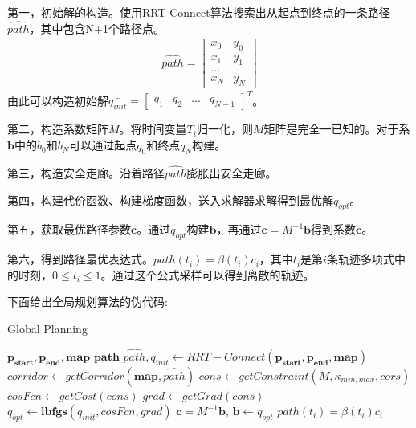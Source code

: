 \documentclass[master,academic]{ysuthesis} %
\begin{document}
		第一，初始解的构造。使用RRT-Connect算法搜索出从起点到终点的一条路径$\hat{path}$，其中包含N+1个路径点。
		\begin{equation}
			\begin{aligned}
				\hat{path} = \begin{bmatrix}
					x_0 &y_0\\
					x_1&y_1\\
					...\\
					x_N& y_N
				\end{bmatrix} 
			\end{aligned}
		\end{equation}
		由此可以构造初始解$\bar{q_{init}}
		=\begin{bmatrix}
			q_1& q_2& ...&q_{N-1}
		\end{bmatrix}^T$。

		第二，构造系数矩阵$M$。将时间变量$T_i$归一化，则$M$矩阵是完全一已知的。对于系$\mathbf{b}$中的$b_0$和$b_N$可以通过起点$q_0$和终点$q_N$构建。
		
		第三，构造安全走廊。沿着路径$\hat{path}$膨胀出安全走廊。

		第四，构建代价函数、构建梯度函数，送入求解器求解得到最优解$q_{opt}$。

		第五，获取最优路径参数$\mathbf{c}$。通过$q_{opt}$构建$\mathbf{b}$，再通过$\mathbf{c} = M^{-1}\mathbf{b}$得到系数$\mathbf{c}$。

		第六，得到路径最优表达式。$path(t_i)=\beta(t_i)c_i$，其中$t_i$是第$i$条轨迹多项式中的时刻，$0 \le t_i \le 1$。通过这个公式采样可以得到离散的轨迹。
		
		下面给出全局规划算法的伪代码:
		 \begin{algorithm}[H]  
		 	\caption{Global Planning}  
		 	\label{alg:global_planning}  
		 	\begin{algorithmic}[1]  
		 		\REQUIRE  
		 		$\mathbf{p_{start}},\mathbf{p_{end}},\mathbf{map}$
		 		\ENSURE  
		 		$\mathbf{path}$
		 		\STATE $\hat{path},q_{init} \leftarrow RRT-Connect(\mathbf{p_{start}},\mathbf{p_{end}},\mathbf{map})$
		 		\STATE $corridor \leftarrow getCorridor(\mathbf{map},\hat{path})$
		 		\STATE $cons \leftarrow getConstraint(M,\kappa_{min,max},cors)$
		 		\STATE $cosFcn \leftarrow getCost(cons)$
		 		\STATE $grad \leftarrow getGrad(cons)$ \\
		 		\STATE $q_{opt} \leftarrow \mathbf{lbfgs}(q_{init},cosFcn,grad)$
				\STATE $\mathbf{c} = M^{-1}\mathbf{b}$, $\mathbf{b} \longleftarrow q_{opt}$
				\RETURN $path(t_i)=\beta(t_i)c_i$
		 	\end{algorithmic}  
		 \end{algorithm}
		
\end{document}

